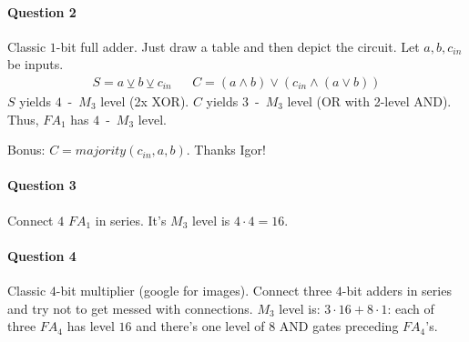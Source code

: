\paragraph{Question 2}
Classic $1$-bit full adder. 
Just draw a table and then depict the circuit.
Let $a,b,c_{in}$ be inputs.
\begin{align*}
S = a\veebar b \veebar c_{in}    &&
C = (a\land b) \lor (c_{in} \land (a \lor b))
\end{align*}
$S$ yields $4$~-~$M_3$ level (2x XOR).
$C$ yields $3$~-~$M_3$ level (OR with 2-level AND).
Thus, $FA_1$ has $4$~-~$M_3$ level.

Bonus: $C = majority(c_{in}, a,b)$.
Thanks Igor!

\paragraph{Question 3}
Connect $4$ $FA_1$ in series.
It's $M_3$ level is $4\cdot4 = 16$. 

\paragraph{Question 4}
Classic $4$-bit multiplier (google for images).
Connect three $4$-bit adders in series and try not to get messed with connections.
$M_3$ level is: $3\cdot 16 + 8\cdot 1$: each of three $FA_4$ has level $16$ and there's one level of $8$ AND gates preceding $FA_4$'s.